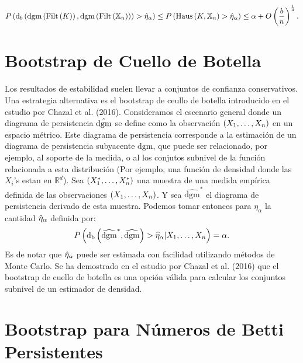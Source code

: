 \begin{equation*}
    P\left(
        \mathrm{d}_{b}\left(
            \mathrm{dgm}\left(\mathrm{Filt}\left(K\right)\right),
            \mathrm{dgm}\left(\mathrm{Filt}\left(\mathbb{X}_{n}\right)\right)
        \right)
        >\Hat{\eta}_{\alpha}
    \right)
    \leq
    P\left(
        \mathrm{Haus}\left(K,\mathbb{X}_{n}\right)>\Hat{\eta}_{\alpha}
    \right)
    \leq
\alpha+O\left(\frac{b}{n}\right)^\frac{1}{4}.
\end{equation*}

\section*{Bootstrap de Cuello de Botella}

Los resultados de estabilidad suelen llevar a conjuntos de confianza conservativos.
Una estrategia alternativa es el bootstrap de ceullo de botella
introducido en el estudio por Chazal et al. (2016)\cite{Chazal2016a}.
Consideramos el escenario general donde un diagrama de persistencia
$\Hat{\mathrm{dgm}}$ se define como la observaci\'on
$\left(X_{1},\dots,X_{n}\right)$ en un espacio m\'etrico.
Este diagrama de persistencia corresponde a la estimaci\'on de
un diagrama de persistencia subyacente $\mathrm{dgm}$,
que puede ser relacionado, por ejemplo, al soporte de la medida,
o al los conjutos subnivel de la funci\'on relacionada a esta distribuci\'on
(Por ejemplo, una funci\'on de densidad donde las $X_{i}$'s estan en
$\mathbb{R}^{d}$).
Sea $\left(X_{1}^{*},\dots,X_{n}^{*}\right)$ una muestra de una medida emp\'irica
definida de las observaciones $\left(X_{1},\dots,X_{n}\right)$.
Y sea $\widehat{\mathrm{dgm}}^{*}$ el diagrama de persistencia
derivado de esta muestra.
Podemos tomar entonces para $\eta_{\alpha}$ la cantidad $\Hat{\eta}_{\alpha}$
definida por:
\begin{equation}
    P\left(\mathrm{d_{b}}\left(
    \widehat{\mathrm{dgm}}^{*},\widehat{\mathrm{dgm}}\right)>\widehat{\eta}_{\alpha}|X_{1},\dots,X_{n}\right) 
    =\alpha.
\end{equation}
Es de notar que $\Hat{\eta}_{\alpha}$ puede ser estimada con facilidad utilizando
m\'etodos de Monte Carlo.
Se ha demostrado en el estudio por Chazal et al. (2016)\cite{Chazal2016b}
que el bootstrap de cuello de botella es una opci\'on v\'alida para calcular
los conjuntos subnivel de un estimador de densidad.

\section*{Bootstrap para N\'umeros de Betti Persistentes}

